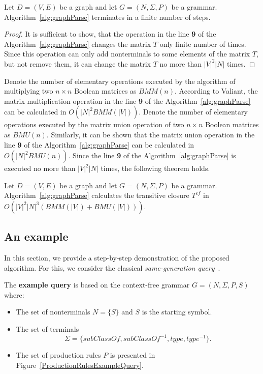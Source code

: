\documentclass[runningheads,a4paper]{llncs}
\begin{document}
\begin{mytheorem}\label{thm:finite}
	Let $D = (V,E)$ be a graph and let $G =(N,\Sigma,P)$ be a grammar. Algorithm~\ref{alg:graphParse} terminates in a finite number of steps. 
\end{mytheorem}
\begin{proof}
	It is sufficient to show, that the operation in the line \textbf{9} of the Algorithm~\ref{alg:graphParse} changes the matrix $T$ only finite number of times. Since this operation can only add nonterminals to some elements of the matrix $T$, but not remove them, it can change the matrix $T$ no more than $|V|^2|N|$ times.
\end{proof}

Denote the number of elementary operations executed by the algorithm of multiplying two $n \times n$ Boolean matrices as $BMM(n)$. According to Valiant, the matrix multiplication operation in the line \textbf{9} of the Algorithm~\ref{alg:graphParse} can be calculated in $O(|N|^2 BMM(|V|))$. Denote the number of elementary operations executed by the matrix union operation of two $n \times n$ Boolean matrices as $BMU(n)$. Similarly, it can be shown that the matrix union operation in the line \textbf{9} of the Algorithm~\ref{alg:graphParse} can be calculated in $O(|N|^2 BMU(n))$. Since the line \textbf{9} of the Algorithm~\ref{alg:graphParse} is executed no more than $|V|^2|N|$ times, the following theorem holds.

\begin{mytheorem}\label{thm:time}
	Let $D = (V,E)$ be a graph and let $G =(N,\Sigma,P)$ be a grammar. Algorithm~\ref{alg:graphParse} calculates the transitive closure $T^{cf}$ in $O(|V|^2|N|^3(BMM(|V|) + BMU(|V|)))$.
\end{mytheorem}



\subsection{An example} \label{section_example}
In this section, we provide a step-by-step demonstration of the proposed algorithm. For this, we consider the classical \textit{same-generation query}~\cite{FndDB}.

The \textbf{example query} is based on the context-free grammar $G = (N, \Sigma, P, S)$ where:
\begin{itemize}
	\item The set of nonterminals $N = \{S\}$ and $S$ is the starting symbol.
	\item The set of terminals $$\Sigma = \{subClassOf, subClassOf^{-1}, type, type^{-1}\}.$$
	\item The set of production rules $P$ is presented in Figure~\ref{ProductionRulesExampleQuery}.
\end{itemize}
\end{document}
